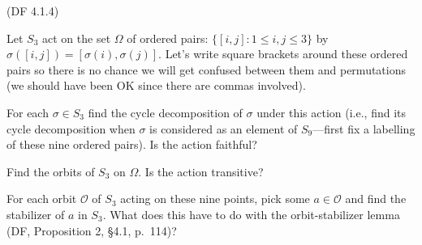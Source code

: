 \begin{problem}{(\textsf{DF 4.1.4})}

  \noindent
  Let $S_3$ act on the set $\Omega$ of ordered pairs:
  $\{[i,j] : 1 \leq i,j \leq 3\}$ by $\sigma([i,j])=[\sigma(i),\sigma(j)]$.
  Let's write square brackets around these ordered pairs
  so there is no chance we will get confused between them
  and permutations (we should have been OK since there are commas involved).
  \begin{enumalph}
    \item For each $\sigma \in S_3$ find the cycle decomposition of $\sigma$
      under this action
      (i.e., find its cycle decomposition when $\sigma$ is considered as an 
      element of $S_9$---first fix a labelling of these nine ordered pairs).
      Is the action faithful?
    \item Find the orbits of $S_3$ on $\Omega$.
      Is the action transitive?
    \item For each orbit $\mathcal{O}$ of $S_3$ acting on these nine points,
      pick some $a \in \mathcal{O}$ and find the stabilizer of $a$ in $S_3$.
      What does this have to do with the orbit-stabilizer lemma
      (DF, Proposition 2, \S 4.1, p.~114)?  
  \end{enumalph}
\end{problem}
